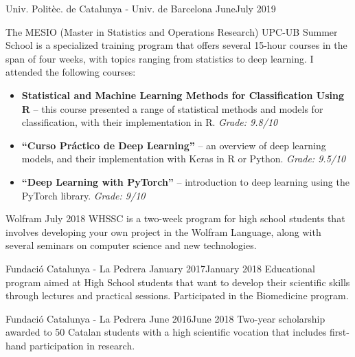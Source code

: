 \documentclass[a4paper, 11pt]{article}
\def\colratio{0.2}
\def\colsep{10pt}
\newenvironment{twocol}{%
    \columnratio{\colratio}%
    \setlength{\columnsep}{\colsep}%
    \begin{sloppypar}%
        \begin{paracol}{2}%
}{%
            \bigskip
        \end{paracol}%
    \end{sloppypar}%
}
\begin{document}
\begin{twocol}

\switchcolumn

\cvsectionrule
{}
{Univ. Politèc. de Catalunya - Univ. de Barcelona}
                 {June}{July 2019}
                 {}
                 {The MESIO (Master in Statistics and Operations Research) UPC-UB Summer School is a specialized training program that offers several 15-hour courses in the span of four weeks, with topics ranging from statistics to deep learning. I attended the following courses:
                     \begin{itemize}
                         \item \textbf{Statistical and Machine Learning Methods for Classification Using R} -- this course presented a range of statistical methods and models for classification, with their implementation in R. \textit{Grade: 9.8/10}
                         \item \textbf{``Curso Práctico de Deep Learning''} -- an overview of deep learning models, and their implementation with Keras in R or Python. \textit{Grade: 9.5/10}
                         \item \textbf{``Deep Learning with PyTorch''} -- introduction to deep learning using the PyTorch library. \textit{Grade: 9/10}
                     \end{itemize}
                 }
     
                  {Wolfram}
                  {July 2018}{}{}
                  {WHSSC is a two-week program for high school students that involves developing your own project in the Wolfram Language, along with several seminars on computer science and new technologies.}
                  
     \smallskip
     {Fundació Catalunya - La Pedrera}
     {January 2017}{January 2018}{}
     {Educational program aimed at High School students that want to develop their scientific skills through lectures and practical sessions. Participated in the Biomedicine program.}
     
     \smallskip
     {Fundació Catalunya - La Pedrera}
     {June 2016}{June 2018}{}
     {Two-year scholarship awarded to 50 Catalan students with a high scientific vocation that includes first-hand participation in research.}
\end{twocol}
\end{document}
